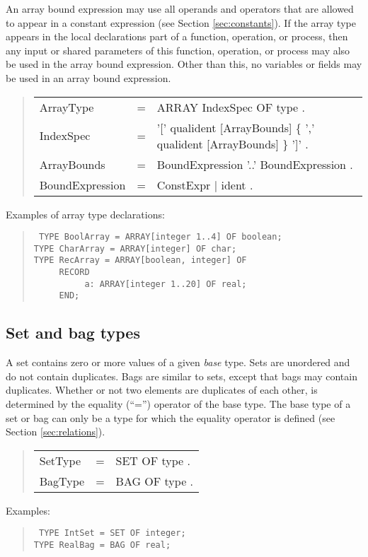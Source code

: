 \documentclass[10pt]{article}
\newenvironment{grammar}
{\begin{quote} \begin{tabular}{p{3.8cm} l l}}
{\end{tabular}\end{quote}}
\begin{document}
An array bound expression may use all operands and operators that
are allowed to appear in a constant expression (see Section \ref{sec:constants}).
If the array type appears in the local declarations part of a function,
operation, or process, then any input or shared
parameters of this function,
operation, or process may also be used in the array bound expression.
Other than this, no variables or fields may be used in an array
bound expression.
\begin{grammar}
ArrayType & = & ARRAY IndexSpec OF type . \\
IndexSpec & = & '[' qualident [ArrayBounds] \{ ',' qualident [ArrayBounds] \} ']' . \\
ArrayBounds & = & BoundExpression '..' BoundExpression . \\
BoundExpression & = & ConstExpr $|$ ident .
\end{grammar}
Examples of array type declarations:
\begin{quote}\tt
TYPE BoolArray = ARRAY[integer 1..4] OF boolean; \\
TYPE CharArray = ARRAY[integer] OF char; \\
TYPE RecArray = ARRAY[boolean, integer] OF \\
\mbox{~~~~~}RECORD \\
\mbox{~~~~~~~~~~}a:~ARRAY[integer 1..20] OF real; \\
\mbox{~~~~~}END;
\end{quote}
\subsection{Set and bag types}\label{sec:set_types}

A set contains zero or more values of a given {\em base} type.
Sets are unordered and do not contain duplicates.
Bags are similar to sets, except that bags may contain duplicates.
Whether or not two elements are duplicates of each other, is determined
by the equality (``='') operator of the base type.
The base type of a set or bag can only be a type for which the
equality operator is defined (see Section \ref{sec:relations}).
\begin{grammar}
SetType & = & SET OF type . \\
BagType & = & BAG OF type .
\end{grammar}
Examples:
\begin{quote}\tt
TYPE IntSet = SET OF integer; \\
TYPE RealBag = BAG OF real;
\end{quote}
\end{document}
